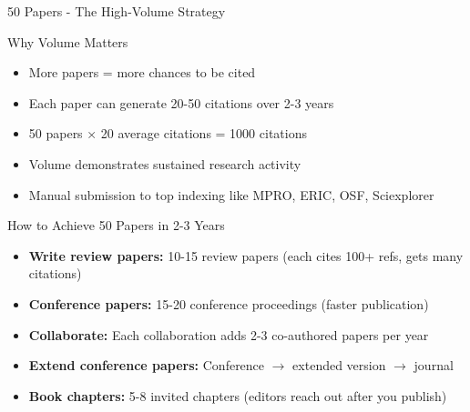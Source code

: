 \documentclass[11pt]{beamer}
\begin{document}
	\begin{frame}{50 Papers - The High-Volume Strategy}
		\scriptsize
		\begin{block}{Why Volume Matters}
			\begin{itemize}
				\item More papers = more chances to be cited
				\item Each paper can generate 20-50 citations over 2-3 years
				\item 50 papers × 20 average citations = 1000 citations
				\item Volume demonstrates sustained research activity
				\item Manual submission to top indexing like MPRO, ERIC, OSF, Sciexplorer
			\end{itemize}
		\end{block}
		\begin{block}{How to Achieve 50 Papers in 2-3 Years}
			\begin{itemize}
				\item \textbf{Write review papers:} 10-15 review papers (each cites 100+ refs, gets many citations)
				\item \textbf{Conference papers:} 15-20 conference proceedings (faster publication)
				\item \textbf{Collaborate:} Each collaboration adds 2-3 co-authored papers per year
				\item \textbf{Extend conference papers:} Conference $\rightarrow$ extended version $\rightarrow$ journal
				\item \textbf{Book chapters:} 5-8 invited chapters (editors reach out after you publish)
			\end{itemize}
		\end{block}
	\end{frame}
	
\end{document}

